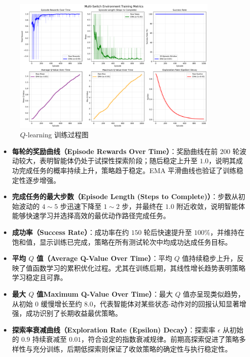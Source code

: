 \begin{figure}[htbp] 
    \centering 
    \includegraphics[width=0.9\textwidth]{figure/multi_switch/multiswitch_training_results.png} 
    \caption{\(Q\)-learning 训练过程图}\label{fig:q-learning_training_results}
\end{figure}

\begin{itemize}
    \item \textbf{每轮的奖励曲线（Episode Rewards Over Time）}：奖励曲线在前 \(200\) 轮波动较大，表明智能体仍处于试探性探索阶段；随后稳定上升至 \(1.0\)，说明其成功完成任务的概率持续上升，策略趋于稳定。EMA 平滑曲线也验证了训练稳定性逐步增强。
    \item \textbf{完成任务的最大步数（Episode Length (Steps to Complete)）}：步数从初始波动的 \(4\sim5\) 步迅速下降至 \(1\sim2\) 步，并最终在 \(1.0\) 附近收敛，说明智能体能够快速学习并选择高效的最优动作路径完成任务。
    \item \textbf{成功率（Success Rate）}：成功率在约 \(150\) 轮后快速提升至 \(100\%\)，并维持在饱和值，显示训练已完成，策略在所有测试轮次中均成功达成任务目标。
    \item \textbf{平均 \(Q\) 值（Average Q-Value Over Time）}：平均 \(Q\) 值持续稳步上升，反映了值函数学习的累积优化过程。尤其在训练后期，其线性增长趋势表明策略学习稳定且可靠。
    \item \textbf{最大 \(Q\) 值Maximum Q-Value Over Time）}：最大 \(Q\) 值亦呈现类似趋势，从初始 \(0\) 缓慢增长至约 \(8.0\)，代表智能体对某些状态-动作对的回报认知显著增强，成功识别了长期收益最优策略。
    \item \textbf{探索率衰减曲线（Exploration Rate (Epsilon) Decay）}：探索率 \(\epsilon\) 从初始的 \(0.9\) 持续衰减至 \(0.01\)，符合设定的指数衰减规律。前期高探索促进了策略多样性与充分训练，后期低探索则保证了收敛策略的确定性与执行稳定性。
\end{itemize}

